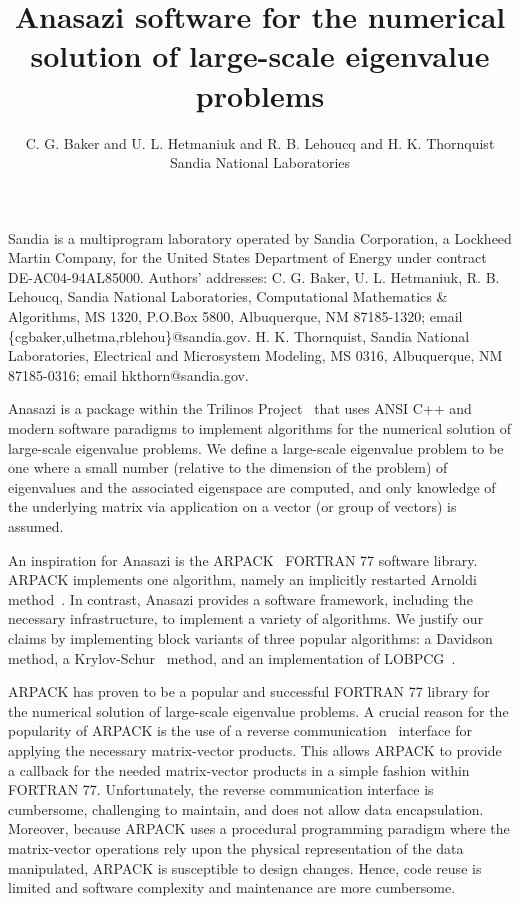 \documentclass[acmtoms]{acmtrans2m}
\title{Anasazi software for the numerical solution of large-scale eigenvalue problems}
\author{C. G. Baker and
U. L. Hetmaniuk and R. B. Lehoucq and H. K. Thornquist\\ Sandia
National Laboratories}
\newcounter{algorithm}
\begin{document}
\begin{bottomstuff}
Sandia is a multiprogram laboratory operated by Sandia Corporation,
a Lockheed Martin Company, for the United States Department of
Energy under contract DE-AC04-94AL85000. Authors' addresses: C. G.
Baker, U. L. Hetmaniuk, R. B. Lehoucq,
Sandia National Laboratories, Computational Mathematics \&
Algorithms, MS 1320, P.O.Box 5800, Albuquerque, NM 87185-1320; email
\{cgbaker,ulhetma,rblehou\}@sandia.gov. H. K. Thornquist, Sandia National
Laboratories, Electrical and Microsystem Modeling, MS 0316,
Albuquerque, NM 87185-0316; email hkthorn@sandia.gov.

\end{bottomstuff}

\maketitle

Anasazi is a package within the Trilinos
Project~\cite{Heroux:2005:OTP} that uses ANSI C++ and modern software
paradigms to implement algorithms for the numerical solution of
large-scale eigenvalue problems. We define a
large-scale eigenvalue problem to be one where a small number
(relative to the dimension of the problem) of eigenvalues and the
associated eigenspace are computed, and only knowledge of the
underlying matrix via application on a vector (or group of vectors)
is assumed.

An inspiration for Anasazi is the ARPACK~\cite{lesy:98} FORTRAN 77 software library.
ARPACK implements one algorithm, namely an implicitly restarted Arnoldi
method~\cite{sore:92}. In contrast, Anasazi provides a software framework, including the
necessary infrastructure, to implement a variety of algorithms. We justify our claims by
implementing block variants of three popular algorithms: a Davidson~\cite{morganscott:86} method,
a Krylov-Schur~\cite{stew:01} method, and an implementation of LOBPCG~\cite{knya:01}.

ARPACK has proven to be a popular and successful FORTRAN 77 library
for the numerical solution of large-scale eigenvalue problems. A
crucial reason for the popularity of ARPACK is the use of a reverse
communication~\cite[p.~3]{lesy:98} interface for applying the
necessary matrix-vector products. This allows ARPACK to provide a
callback for the needed matrix-vector products in a simple fashion
within FORTRAN 77. Unfortunately, the reverse communication
interface is cumbersome, challenging to maintain, and does not allow
data encapsulation. Moreover, because ARPACK uses a procedural
programming paradigm where the matrix-vector operations rely upon
the physical representation of the data manipulated, ARPACK is
susceptible to design changes. Hence, code reuse is limited and
software complexity and maintenance are more cumbersome.
\end{document}
